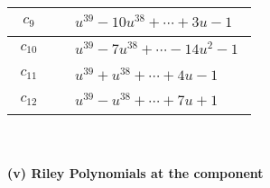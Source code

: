 \documentclass[1p]{elsarticle_modified}
\theoremstyle{definition}
\begin{document}
\begin{tabular}{m{50pt}|m{274pt}}
\hline $$\begin{aligned}c_{9}\end{aligned}$$&$\begin{aligned}
&u^{39}-10 u^{38}+\cdots+3 u-1
\end{aligned}$\\
\hline $$\begin{aligned}c_{10}\end{aligned}$$&$\begin{aligned}
&u^{39}-7 u^{38}+\cdots-14 u^2-1
\end{aligned}$\\
\hline $$\begin{aligned}c_{11}\end{aligned}$$&$\begin{aligned}
&u^{39}+u^{38}+\cdots+4 u-1
\end{aligned}$\\
\hline $$\begin{aligned}c_{12}\end{aligned}$$&$\begin{aligned}
&u^{39}- u^{38}+\cdots+7 u+1
\end{aligned}$\\
\hline
\end{tabular}\\~\\
\newpage\renewcommand{\arraystretch}{1}
\flushleft \textbf{(v) Riley Polynomials at the component}\newline \\
\end{document}
